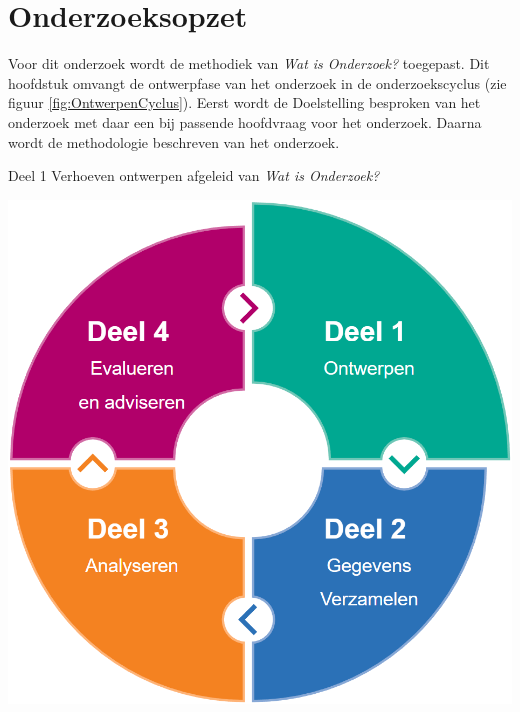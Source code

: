 \chapter{Onderzoeksopzet}
Voor dit onderzoek wordt de methodiek van \textit{Wat is Onderzoek?} \Parencite{Verhoeven} toegepast. 
Dit hoofdstuk omvangt de ontwerpfase van het onderzoek in de onderzoekscyclus (zie figuur \ref{fig:OntwerpenCyclus}).
Eerst wordt de Doelstelling besproken van het onderzoek met daar een bij passende hoofdvraag voor het onderzoek.
Daarna wordt de methodologie beschreven van het onderzoek.

\begin{graphic}
	\vspace{0.2cm}
	\captionsetup{type=figure}
    \caption{Deel 1 Verhoeven ontwerpen afgeleid van \textit{Wat is Onderzoek?}}
	\includegraphics[scale=0.3]{img/OntwerpenCyclus.png}
	\label{fig:OntwerpenCyclus}
	\vspace{0.2cm}
\end{graphic}


\newpage

% 
% 
